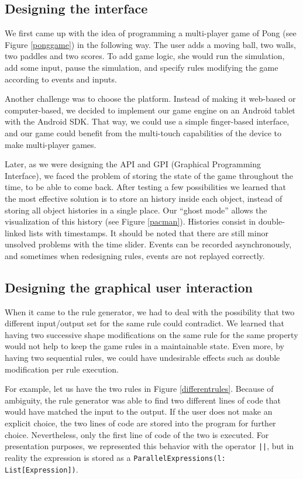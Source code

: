 \documentclass[12pt]{article} %
\begin{document}
\subsection{Designing the interface}



We first came up with the idea of programming a multi-player game of Pong (see
Figure \ref{ponggame}) in the following way. The user adds a moving ball, two
walls, two paddles and two scores. To add game logic, she would run the
simulation, add some input, pause the simulation, and specify rules modifying
the game according to events and inputs.



Another challenge was to choose the platform. Instead of making it web-based
or computer-based, we decided to implement our game engine on an Android
tablet with the Android SDK. That way, we could use a simple finger-based
interface, and our game could benefit from the multi-touch capabilities of the
device to make multi-player games.

Later, as we were designing the API and GPI (Graphical Programming Interface),
we faced the problem of storing the state of the game throughout the time, to be
able to come back. After testing a few possibilities we learned that the most
effective solution is to store an history inside each object, instead of storing
all object histories in a single place. Our ``ghost mode'' allows the
visualization of this history (see Figure \ref{pacman}). Histories consist in
double-linked lists with timestamps.
It should be noted that there are still minor unsolved problems with the
time slider. Events can be recorded asynchronously, and sometimes when
redesigning rules, events are not replayed correctly.

\subsection{Designing the graphical user interaction}

When it came to the rule generator, we had to deal with the possibility that
two different input/output set for the same rule could contradict. We learned
that having two successive shape modifications on the same rule for the same
property would not help to keep the game rules in a maintainable state. Even
more, by having two sequential rules, we could have undesirable effects such as
double modification per rule execution.

For example, let us have the two rules in Figure \ref{differentrules}.
Because of ambiguity, the rule generator was able to find two
different lines of code that would have matched the input to the output.
If the user does not make an explicit choice, the two lines of code are stored
into the program for further choice. Nevertheless, only the first line of code
of the two is executed. For presentation purposes, we represented this behavior
with the operator \texttt{||},
but in reality the expression is stored as a
\texttt{ParallelExpressions(l: List[Expression])}.
\end{document}
